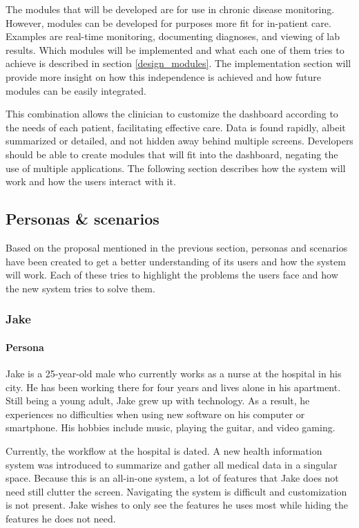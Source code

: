     The modules that will be developed are for use in chronic disease monitoring. However, modules can be developed for purposes more fit for in-patient care. Examples are real-time monitoring, documenting diagnoses, and viewing of lab results. Which modules will be implemented and what each one of them tries to achieve is described in section \ref{design_modules}. The implementation section will provide more insight on how this independence is achieved and how future modules can be easily integrated.

    This combination allows the clinician to customize the dashboard according to the needs of each patient, facilitating effective care. Data is found rapidly, albeit summarized or detailed, and not hidden away behind multiple screens. Developers should be able to create modules that will fit into the dashboard, negating the use of multiple applications. The following section describes how the system will work and how the users interact with it.

    \subsection{Personas \& scenarios} \label{3_personas_scenarios}

    Based on the proposal mentioned in the previous section, personas and scenarios have been created to get a better understanding of its users and how the system will work. Each of these tries to highlight the problems the users face and how the new system tries to solve them.

        \subsubsection{Jake}

        \paragraph{Persona} Jake is a 25-year-old male who currently works as a nurse at the hospital in his city. He has been working there for four years and lives alone in his apartment. Still being a young adult, Jake grew up with technology. As a result, he experiences no difficulties when using new software on his computer or smartphone. His hobbies include music, playing the guitar, and video gaming.

        Currently, the workflow at the hospital is dated. A new health information system was introduced to summarize and gather all medical data in a singular space. Because this is an all-in-one system, a lot of features that Jake does not need still clutter the screen. Navigating the system is difficult and customization is not present. Jake wishes to only see the features he uses most while hiding the features he does not need.
        
